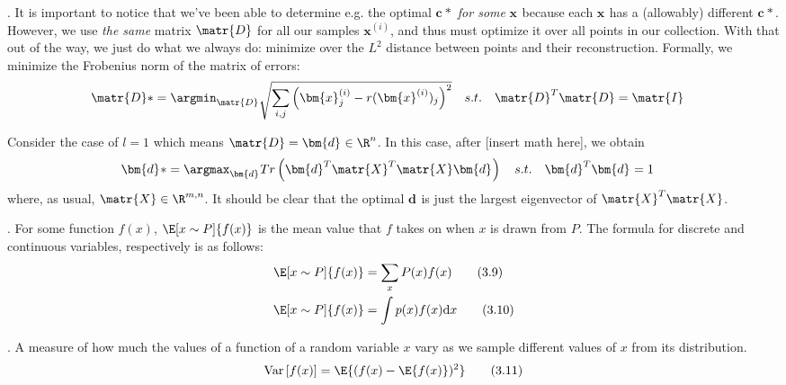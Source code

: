 \documentclass[11pt]{article}
\renewcommand\vec[2][]{\bm{#2}_{#1}}
\newcommand\myspace[1][]{\vspace{#1\bigskipamount}}
\newcommand\p{\Needspace{10\baselineskip} \noindent}
\newcommand\tlab[1]{\tag{#1}\label{#1}}
\newcommand\Var[1]{\mathrm{Var}\left[#1\right]}
\begin{document}
\myspace
\p {}. It is important to notice that we've been able to determine e.g. the optimal $\vec{c}*$ \textit{for some} $\vec{x}$ because each $\vec{x}$ has a (allowably) different $\vec{c}*$. However, we use \textit{the same} matrix $\matr{D}$ for all our samples $\vec{x}^{(i)}$, and thus must optimize it over all points in our collection. With that out of the way, we just do what we always do: minimize over the $L^2$ distance between points and their reconstruction. Formally, we minimize the Frobenius norm of the matrix of errors:
\begin{align}
\matr{D}* &= \argmin_{\matr{D}} \sqrt{ 
		\sum_{i,j} \left( \vec[j]{x}^{(i)}  -   r(\vec{x}^{(i)})_j \right)^2
	  } \quad s.t. \quad \matr{D}^T \matr{D} = \matr{I}
\end{align} 

\p Consider the case of $l = 1$ which means $\matr{D} = \vec{d} \in \R^n$. In this case, after [insert math here], we obtain
\begin{align}
	\vec{d}* &= \argmax_{\vec{d}} Tr\left( \vec{d}^T \matr{X}^T \matr{X} \vec{d} \right)
	\quad s.t. \quad \vec{d}^T \vec{d} = 1
\end{align}
where, as usual, $\matr{X} \in \R^{m,n}$. It should be clear that the optimal $\vec{d}$ is just the largest eigenvector of $\matr{X}^T \matr{X}$. 



\p {}. For some function $f(x)$, $\E[x \sim P]{f(x)}$ is the mean value that $f$ takes on when $x$ is drawn from $P$. The formula for discrete and continuous variables, respectively is as follows:
\begin{align}
\E[x \sim P]{f(x)} &= \sum_x P(x) f(x) \tlab{3.9} \\
\E[x \sim P]{f(x)} &= \int p(x) f(x) \mathrm{d}x \tlab{3.10} 
\end{align}

\myspace 
\p {}. A measure of how much the values of a function of a random variable $x$ vary as we sample different values of $x$ from its distribution.
\begin{align}
\Var{f(x)} = \E{(f(x) - \E{f(x)})^2} \tlab{3.11}
\end{align}
\end{document}
